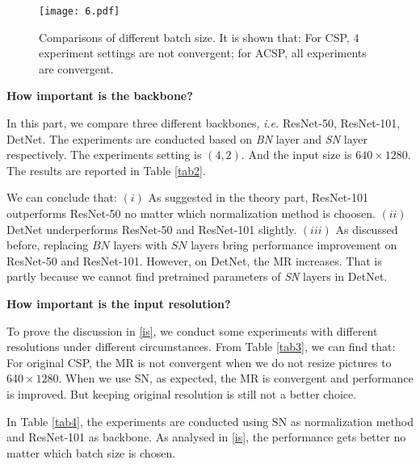 \documentclass[twocolumn]{article}
\begin{document}
\begin{figure}[h]
\centering
\texttt{[image: 6.pdf]}
\caption{Comparisons of different batch size. It is shown that: For CSP\cite{liu2019high}, $4$ experiment settings are not convergent; for ACSP, all experiments are convergent.}
\label{fig:4}
\end{figure}





\textbf{How important is the backbone?}\par 
In this part, we compare three different backbones, \textit{i.e.} ResNet-50\cite{luo2018differentiable}, ResNet-101\cite{luo2018differentiable}, DetNet\cite{li2018detnet}. The experiments are conducted based on \textit{BN} layer and \textit{SN} layer respectively. The experiments setting is $(4, 2)$. And the input size is $640 \times 1280$. The results are reported in Table \ref{tab2}.\par 
We can conclude that: $(i)$ As suggested in the theory part, ResNet-101\cite{luo2018differentiable} outperforms ResNet-50\cite{luo2018differentiable} no matter which normalization method is choosen. $(ii)$ DetNet\cite{li2018detnet} underperforms ResNet-50\cite{luo2018differentiable} and ResNet-101\cite{luo2018differentiable} slightly. $(iii)$ As discussed before, replacing $BN$ layers with $SN$ layers bring performance improvement on ResNet-50\cite{luo2018differentiable} and ResNet-101\cite{luo2018differentiable}. However, on DetNet\cite{li2018detnet}, the MR increases. That is partly because we cannot find pretrained parameters of  \textit{SN} layers in DetNet\cite{li2018detnet}.

\textbf{How important is the input resolution?}\par 
To prove the discussion in \ref{is}, we conduct some experiments with different resolutions under different circumstances. From Table \ref{tab3}, we can find that: For original CSP\cite{liu2019high}, the MR is not convergent when we do not resize pictures to $640 \times 1280$. When we use SN, as expected, the MR is convergent and performance is improved. But keeping original resolution is still not a better choice.\par 
In Table \ref{tab4}, the experiments are conducted using SN as normalization method and ResNet-101 as backbone. As analysed in \ref{is}, the performance gets better no matter which batch size is chosen.
\end{document}

